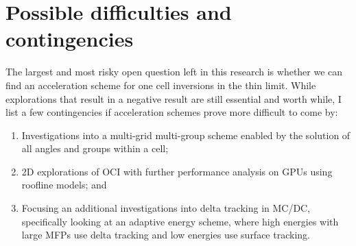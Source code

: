 \section{Possible difficulties and contingencies}
The largest and most risky open question left in this research is whether we can find an acceleration scheme for one cell inversions in the thin limit.
While explorations that result in a negative result are still essential and worth while, I list a few contingencies if acceleration schemes prove more difficult to come by:
\begin{enumerate}
    \item Investigations into a multi-grid multi-group scheme enabled by the solution of all angles and groups within a cell;
    \item 2D explorations of OCI with further performance analysis on GPUs using roofline models; and
    \item Focusing an additional investigations into delta tracking in MC/DC, specifically looking at an adaptive energy scheme, where high energies with large MFPs use delta tracking and low energies use surface tracking.
\end{enumerate}


